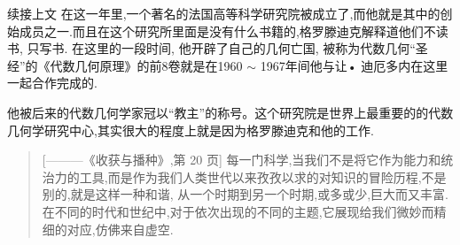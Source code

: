 \documentclass[10pt,aspectratio=169,english,fontset=none]{beamer}
\begin{document}
\begin{frame}[fragile]{续接上文}
  在这一年里,一个著名的法国高等科学研究院被成立了,而他就是其中的创始成员之一.而且在这个研究所里面是没有什么书籍的,格罗滕迪克解释道他们不读书, 只写书. 在这里的一段时间, 他开辟了自己的几何亡国, 被称为代数几何“圣经”的《代数几何原理》的前8卷就是在1960 $\sim $ 1967年间他与让• 迪厄多内在这里一起合作完成的.

他被后来的代数几何学家冠以“教主”的称号。这个研究院是世界上最重要的的代数几何学研究中心,其实很大的程度上就是因为格罗滕迪克和他的工作.

\begin{quotation}[---------《收获与播种》,第 20 页]
  每一门科学,当我们不是将它作为能力和统治力的工具,而是作为我们人类世代以来孜孜以求的对知识的冒险历程,不是别的,就是这样一种和谐, 从一个时期到另一个时期,或多或少,巨大而又丰富.  在不同的时代和世纪中,对于依次出现的不同的主题,它展现给我们微妙而精细的对应,仿佛来自虚空.
\end{quotation}
\end{frame}
\end{document}

